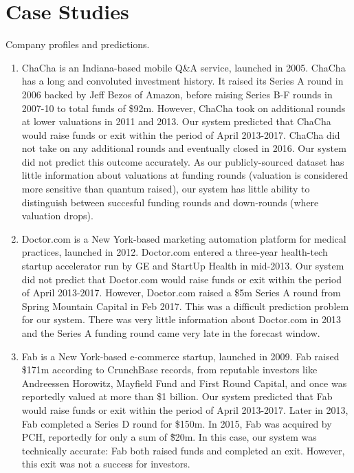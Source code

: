 \chapter{Case Studies}
\label{appendix:case_studies}

\begin{table}[!htb]
    \centering
    \scalebox{0.9}{}
    \caption[Company profiles and predictions]{Company profiles and predictions.}
    \label{tab:evaluation:example_predictions}
\end{table}

\begin{enumerate}

\item ChaCha is an Indiana-based mobile Q\&A service, launched in 2005. ChaCha has a long and convoluted investment history. It raised its Series A round in 2006 backed by Jeff Bezos of Amazon, before raising Series B-F rounds in 2007-10 to total funds of \$92m. However, ChaCha took on additional rounds at lower valuations in 2011 and 2013. Our system predicted that ChaCha would raise funds or exit within the period of April 2013-2017. ChaCha did not take on any additional rounds and eventually closed in 2016. Our system did not predict this outcome accurately. As our publicly-sourced dataset has little information about valuations at funding rounds (valuation is considered more sensitive than quantum raised), our system has little ability to distinguish between succesful funding rounds and down-rounds (where valuation drops).

\item Doctor.com is a New York-based marketing automation platform for medical practices, launched in 2012. Doctor.com entered a three-year health-tech startup accelerator run by GE and StartUp Health in mid-2013. Our system did not predict that Doctor.com would raise funds or exit within the period of April 2013-2017. However, Doctor.com raised a \$5m Series A round from Spring Mountain Capital in Feb 2017. This was a difficult prediction problem for our system. There was very little information about Doctor.com in 2013 and the Series A funding round came very late in the forecast window.

\item Fab is a New York-based e-commerce startup, launched in 2009. Fab raised \$171m according to CrunchBase records, from reputable investors like Andreessen Horowitz, Mayfield Fund and First Round Capital, and once was reportedly valued at more than \$1 billion. Our system predicted that Fab would raise funds or exit within the period of April 2013-2017. Later in 2013, Fab completed a Series D round for \$150m. In 2015, Fab was acquired by PCH, reportedly for only a sum of \~\$20m. In this case, our system was technically accurate: Fab both raised funds and completed an exit. However, this exit was not a success for investors.


\end{enumerate}
